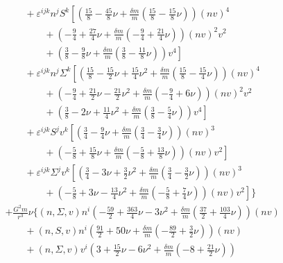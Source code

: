 {\begin{align}
& \qquad+ \varepsilon^{ijk} n^{j} S^{k}\left[\left(\frac{15}{8} -\frac{45}{8} \nu+\frac{\delta m}{m}\left(\frac{15}{8} -\frac{15}{8} \nu\right)\right) (nv)^4\right.\nonumber\\
    &\left.\qquad\qquad+\left(-\frac{9}{4} + \frac{27}{4} \nu+\frac{\delta m}{m}\left(-\frac{9}{4} + \frac{21}{4} \nu\right)\right) (nv)^2 v^{2}\right.\nonumber\\
    &\left.\qquad\qquad+\left(\frac{3}{8} -\frac{9}{8} \nu+\frac{\delta m}{m}\left(\frac{3}{8} -\frac{11}{8} \nu\right)\right) v^{4}\right] \nonumber \\ 
& \qquad+ \varepsilon^{ijk} n^{j} \Sigma^{k}\left[\left(\frac{15}{8} -\frac{15}{2} \nu + \frac{15}{4} \nu^2+\frac{\delta m}{m}\left(\frac{15}{8} -\frac{15}{4} \nu\right)\right) (nv)^4\right.\nonumber\\
    &\left.\qquad\qquad+\left(-\frac{9}{4} + \frac{21}{2} \nu -\frac{21}{2} \nu^2+\frac{\delta m}{m}\left(-\frac{9}{4} + 6 \nu\right)\right) (nv)^2 v^{2}\right.\nonumber\\
    &\left.\qquad\qquad+\left(\frac{3}{8} -2 \nu + \frac{11}{4} \nu^2+\frac{\delta m}{m}\left(\frac{3}{8} -\frac{5}{4} \nu\right)\right) v^{4}\right] \nonumber \\ 
& \qquad+ \varepsilon^{ijk} S^{j} v^{k}\left[\left(\frac{3}{4} -\frac{9}{4} \nu+\frac{\delta m}{m}\left(\frac{3}{4} -\frac{3}{4} \nu\right)\right) (nv)^3\right.\nonumber\\
    &\left.\qquad\qquad+\left(-\frac{5}{8} + \frac{15}{8} \nu+\frac{\delta m}{m}\left(-\frac{5}{8} + \frac{13}{8} \nu\right)\right) (nv) v^{2}\right] \nonumber \\ 
& \qquad+ \varepsilon^{ijk} \Sigma^{j} v^{k}\left[\left(\frac{3}{4} -3 \nu + \frac{3}{2} \nu^2+\frac{\delta m}{m}\left(\frac{3}{4} -\frac{3}{2} \nu\right)\right) (nv)^3\right.\nonumber\\
    &\left.\qquad\qquad+\left(-\frac{5}{8} + 3 \nu -\frac{13}{4} \nu^2+\frac{\delta m}{m}\left(-\frac{5}{8} + \frac{7}{4} \nu\right)\right) (nv) v^{2}\right]\bigg\}\nonumber \\
 &+\frac{G^{2}m}{r^{3}}\nu\bigg\{(n,\Sigma ,v) n^{i}\left(-\frac{59}{2} + \frac{363}{4} \nu -3 \nu^2+\frac{\delta m}{m}\left(\frac{37}{2} + \frac{103}{4} \nu\right)\right) (nv) \nonumber \\ 
& \qquad+ (n,S,v) n^{i}\left(\frac{91}{2} + 50 \nu+\frac{\delta m}{m}\left(-\frac{89}{2} + \frac{3}{2} \nu\right)\right) (nv) \nonumber \\ 
& \qquad+ (n,\Sigma ,v) v^{i}\left(3 + \frac{15}{2} \nu -6 \nu^2+\frac{\delta m}{m}\left(-8 + \frac{21}{2} \nu\right)\right) \nonumber \\ 

\end{align}}
